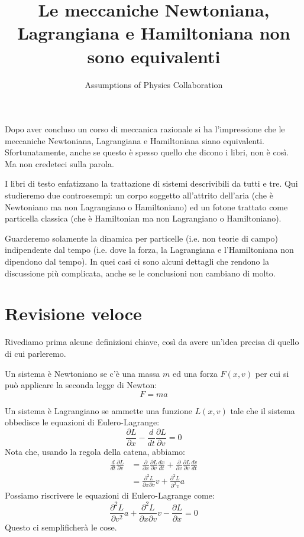 \documentclass[11pt]{article}
\begin{document}
	

\title{Le meccaniche Newtoniana, Lagrangiana e Hamiltoniana non sono equivalenti}
\author{Assumptions of Physics Collaboration}

\date{}

\maketitle

Dopo aver concluso un corso di meccanica razionale si ha l'impressione che le meccaniche Newtoniana, Lagrangiana e Hamiltoniana siano equivalenti. Sfortunatamente, anche se questo \`e spesso quello che dicono i libri, non \`e cos\`i. Ma non credeteci sulla parola.

I libri di testo enfatizzano la trattazione di sistemi descrivibili da tutti e tre. Qui studieremo due controesempi: un corpo soggetto all'attrito dell'aria (che \`e Newtoniano ma non Lagrangiano o Hamiltoniano) ed un fotone trattato come particella classica (che \`e Hamiltonian ma non Lagrangiano o Hamiltoniano).

Guarderemo solamente la dinamica per particelle (i.e. non teorie di campo) indipendente dal tempo (i.e. dove la forza, la Lagrangiana e l'Hamiltoniana non dipendono dal tempo). In quei casi ci sono alcuni dettagli che rendono la discussione pi\`u complicata, anche se le conclusioni non cambiano di molto.

\section{Revisione veloce}

Rivediamo prima alcune definizioni chiave, cos\`i da avere un'idea precisa di quello di cui parleremo.

Un sistema \`e Newtoniano se c'\`e una massa $m$ ed una forza $F(x,v)$ per cui si pu\`o applicare la seconda legge di Newton:
\begin{equation}
\label{Fma}
F=ma
\end{equation}

Un sistema \`e Lagrangiano se ammette una funzione $L(x,v)$ tale che il sistema obbedisce le equazioni di Eulero-Lagrange:
\begin{equation}
\label{EulerLagrange}
\frac{\partial L}{\partial x} - \frac{d}{dt} \frac{\partial L}{\partial v} = 0
\end{equation}
Nota che, usando la regola della catena, abbiamo:
\begin{align*}
\frac{d}{dt} \frac{\partial L}{\partial v} &= \frac{\partial}{\partial x} \frac{\partial L}{\partial v} \frac{dx}{dt} + \frac{\partial}{\partial v}  \frac{\partial L}{\partial v} \frac{dv}{dt} \\
&= \frac{\partial^2 L}{\partial x \partial v} v + \frac{\partial^2 L}{\partial^2 v} a
\end{align*}
Possiamo riscrivere le equazioni di Eulero-Lagrange come:
\begin{equation}
\label{EulerLagrangeMod}
\frac{\partial^2 L}{\partial v^2} a + \frac{\partial^2 L}{\partial x \partial v} v - \frac{\partial L}{\partial x}=0
\end{equation}
Questo ci semplificher\`a le cose.
\end{document}
